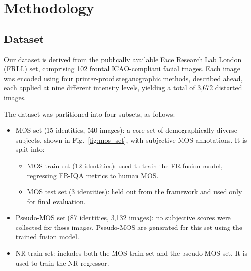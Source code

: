 \section{Methodology}\label{sec:methodology}

\subsection{Dataset}

Our dataset is derived from the publically available Face Research Lab London~\cite{frll} (FRLL) set, comprising 102 frontal ICAO-compliant facial images. Each image was encoded using four printer-proof steganographic methods, described ahead, each applied at nine different intensity levels, yielding a total of 3,672 distorted images.

The dataset was partitioned into four subsets, as follows:

\begin{itemize}
    \item MOS set (15 identities, 540 images): a core set of demographically diverse subjects, shown in Fig.~\ref{fig:mos_set}, with subjective MOS annotations. It is split into:
    \begin{itemize}
        \item MOS train set (12 identities): used to train the FR fusion model, regressing FR-IQA metrics to human MOS.\@
        \item MOS test set (3 identities): held out from the framework and used only for final evaluation.
    \end{itemize}
    \item Pseudo-MOS set (87 identities, 3,132 images): no subjective scores were collected for these images. Pseudo-MOS are generated for this set using the trained fusion model.
    \item NR train set: includes both the MOS train set and the pseudo-MOS set. It is used to train the NR regressor.
\end{itemize}

